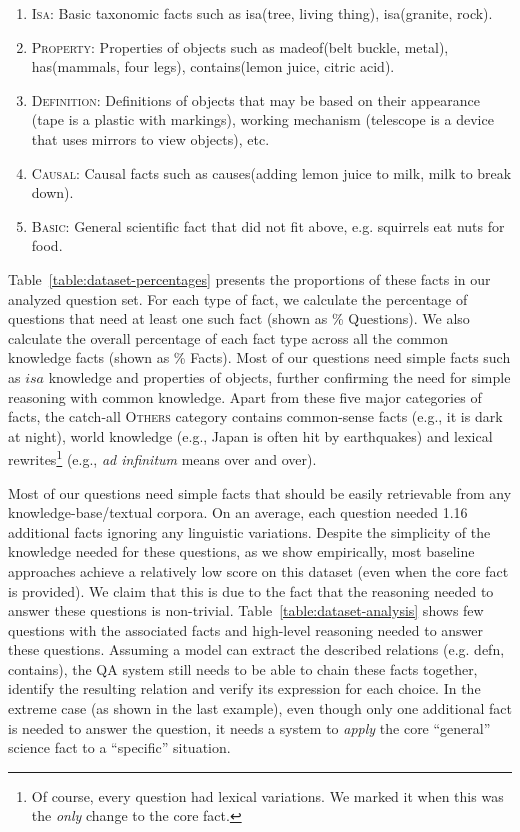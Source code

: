 \begin{enumerate}[itemsep=-2pt, itemindent=-4pt]
\item 
\textsc{Isa}: Basic taxonomic facts such as isa(tree, living thing), isa(granite, rock).

\item 
\textsc{Property}: Properties of objects such as madeof(belt buckle, metal), has(mammals, four legs), contains(lemon juice, citric acid). 

\item 
\textsc{Definition}: Definitions of objects that may be based on their appearance (tape is a plastic with markings), working mechanism (telescope is a device that uses mirrors to view objects), etc. 

\item 
\textsc{Causal}: Causal facts such as causes(adding lemon juice to milk, milk to break down). 

\item 
\textsc{Basic}: General scientific fact that did not fit above, e.g. squirrels eat nuts for food.  
\end{enumerate}

Table~\ref{table:dataset-percentages} presents the proportions of these facts in our analyzed question set. For each type of fact, we calculate the percentage of questions that need at least one such fact (shown as \% Questions). We also calculate the overall percentage of each fact type across all the common knowledge facts (shown as \% Facts). Most of our questions need simple facts such as $isa$ knowledge and properties of objects, further confirming the need for simple reasoning with common knowledge. Apart from these five major categories of facts, the catch-all \textsc{Others} category contains common-sense facts (e.g., it is dark at night), world knowledge (e.g., Japan is often hit by earthquakes) and lexical rewrites\footnote{Of course, every question had lexical variations. We marked it when this was the \emph{only} change to the core fact.} (e.g., \emph{ad infinitum} means over and over). 

Most of our questions need simple facts that should be easily retrievable from any knowledge-base/textual corpora. On an average, each question needed 1.16 additional facts ignoring any linguistic variations. Despite the simplicity of the knowledge needed for these questions, as we show empirically, most baseline approaches achieve a relatively low score on this dataset (even when the core fact is provided). We claim that this is due to the fact that the reasoning needed to answer these questions is non-trivial. Table~\ref{table:dataset-analysis} shows few questions with the associated facts and high-level reasoning needed to answer these questions. Assuming a model can extract the described relations (e.g. defn, contains), the QA system still needs to be able to chain these facts together, identify the resulting relation and verify its expression for each choice. In the extreme case (as shown in the last example), even though only one additional fact is needed to answer the question, it needs a system to \emph{apply} the core ``general'' science fact to a ``specific'' situation.

